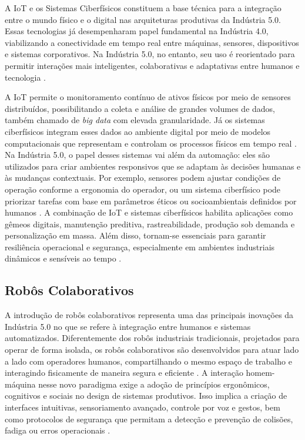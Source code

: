 A \gls{IoT} e os Sistemas Ciberfísicos constituem a base técnica para a integração entre o mundo físico e o digital nas arquiteturas produtivas da Indústria 5.0. Essas tecnologias já desempenharam papel fundamental na Indústria 4.0, viabilizando a conectividade em tempo real entre máquinas, sensores, dispositivos e sistemas corporativos. Na Indústria 5.0, no entanto, seu uso é reorientado para permitir interações mais inteligentes, colaborativas e adaptativas entre humanos e tecnologia \cite{VALETTE2023, PIZON2023}.

A IoT permite o monitoramento contínuo de ativos físicos por meio de sensores distribuídos, possibilitando a coleta e análise de grandes volumes de dados, também chamado de \textit{big data} com elevada granularidade. Já os sistemas ciberfísicos integram esses dados ao ambiente digital por meio de modelos computacionais que representam e controlam os processos físicos em tempo real \cite{TOTH2023}. Na Indústria 5.0, o papel desses sistemas vai além da automação: eles são utilizados para criar ambientes responsivos que se adaptam às decisões humanas e às mudanças contextuais. Por exemplo, sensores podem ajustar condições de operação conforme a ergonomia do operador, ou um sistema ciberfísico pode priorizar tarefas com base em parâmetros éticos ou socioambientais definidos por humanos \cite{TOTH2023}. A combinação de \gls{IoT} e sistemas ciberfísicos habilita aplicações como gêmeos digitais, manutenção preditiva, rastreabilidade, produção sob demanda e personalização em massa. Além disso, tornam-se essenciais para garantir resiliência operacional e segurança, especialmente em ambientes industriais dinâmicos e sensíveis ao tempo \cite{VALETTE2023}.

\subsection{Robôs Colaborativos}

A introdução de robôs colaborativos representa uma das principais inovações da Indústria 5.0 no que se refere à integração entre humanos e sistemas automatizados. Diferentemente dos robôs industriais tradicionais, projetados para operar de forma isolada, os robôs colaborativos são desenvolvidos para atuar lado a lado com operadores humanos, compartilhando o mesmo espaço de trabalho e interagindo fisicamente de maneira segura e eficiente \cite{PIZON2023, TOTH2023}. A interação homem-máquina nesse novo paradigma exige a adoção de princípios ergonômicos, cognitivos e sociais no design de sistemas produtivos. Isso implica a criação de interfaces intuitivas, sensoriamento avançado, controle por voz e gestos, bem como protocolos de segurança que permitam a detecção e prevenção de colisões, fadiga ou erros operacionais \cite{TOTH2023, YANG2024}.

